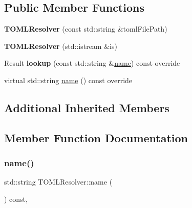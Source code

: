 \subsection*{Public Member Functions}
\begin{DoxyCompactItemize}
\item 
\mbox{\label{classtheoria_1_1config_1_1TOMLResolver_a94a2659c23a5c85d05fb62e67c8c7810}} 
{\bfseries T\+O\+M\+L\+Resolver} (const std\+::string \&toml\+File\+Path)
\item 
\mbox{\label{classtheoria_1_1config_1_1TOMLResolver_a2772b7d149cabddd2b622b786720420f}} 
{\bfseries T\+O\+M\+L\+Resolver} (std\+::istream \&is)
\item 
\mbox{\label{classtheoria_1_1config_1_1TOMLResolver_a42daff166eca2c9c9dd77868faf0122d}} 
Result {\bfseries lookup} (const std\+::string \&\hyperlink{classtheoria_1_1config_1_1TOMLResolver_a6b50ff1e396f74183318915e602837fc}{name}) const override
\item 
virtual std\+::string \hyperlink{classtheoria_1_1config_1_1TOMLResolver_a6b50ff1e396f74183318915e602837fc}{name} () const override
\end{DoxyCompactItemize}
\subsection*{Additional Inherited Members}


\subsection{Member Function Documentation}
\mbox{\label{classtheoria_1_1config_1_1TOMLResolver_a6b50ff1e396f74183318915e602837fc}} 
\subsubsection{\texorpdfstring{name()}{name()}}
{\footnotesize\ttfamily std\+::string T\+O\+M\+L\+Resolver\+::name (\begin{DoxyParamCaption}{ }\end{DoxyParamCaption}) const\hspace{0.3cm}{\ttfamily [override]}, {\ttfamily [virtual]}}

